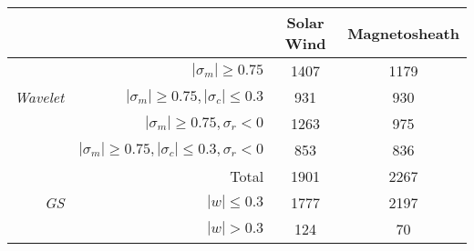 \begin{tabular}{rrcc}
\hline
& & Solar Wind & Magnetosheath \\
\hline
                  & $|\sigma_m|\geq0.75$                                & 1407 & 1179 \\
\textit{Wavelet}  & $|\sigma_m|\geq0.75, |\sigma_c|\leq0.3$             & 931  & 930 \\
                  & $|\sigma_m|\geq0.75, \sigma_r<0$                    & 1263 & 975 \\
                  & $|\sigma_m|\geq0.75, |\sigma_c|\leq0.3, \sigma_r<0$ & 853  & 836 \\
\hline
                   & Total 		& 1901 & 2267 \\
\textit{GS}        & $|w|\leq 0.3$ & 1777 & 2197 \\
                   & $|w|> 0.3$    & 124  & 70 \\
\hline
\end{tabular}